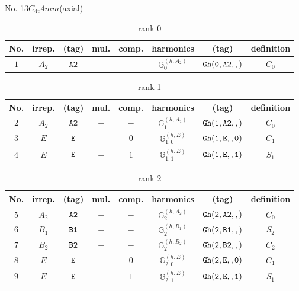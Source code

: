 \documentclass[fleqn,8pt]{jsarticle}
\begin{document}
\setcounter{MaxMatrixCols}{16}

\begin{center}
\LARGE
No. 13\quad$C_{4v}$\quad$4mm$\quad[ tetragonal ] (axial)
\end{center}
\begin{table}[ht!]
\begin{center}
\caption{rank 0}
\renewcommand{\arraystretch}{1.3}
\begin{tabular}{cccccccc} \hline \hline
No. & irrep. & (tag) & mul. & comp. & harmonics & (tag) & definition \\ \hline
$ 1 $ & $ A_{2} $ & $ {\tt A2} $ & $ - $ & $ - $ & $ \mathbb{G}_{0}^{(h,A_{2})} $ & $ {\tt Gh(0,A2,,)} $ & $ C_{0} $ \\
 \hline \hline
\end{tabular}
\end{center}
\end{table}
\begin{table}[ht!]
\begin{center}
\caption{rank 1}
\renewcommand{\arraystretch}{1.3}
\begin{tabular}{cccccccc} \hline \hline
No. & irrep. & (tag) & mul. & comp. & harmonics & (tag) & definition \\ \hline
$ 2 $ & $ A_{2} $ & $ {\tt A2} $ & $ - $ & $ - $ & $ \mathbb{G}_{1}^{(h,A_{2})} $ & $ {\tt Gh(1,A2,,)} $ & $ C_{0} $ \\
$ 3 $ & $ E $ & $ {\tt E} $ & $ - $ & $ 0 $ & $ \mathbb{G}_{1,0}^{(h,E)} $ & $ {\tt Gh(1,E,,0)} $ & $ C_{1} $ \\
$ 4 $ & $ E $ & $ {\tt E} $ & $ - $ & $ 1 $ & $ \mathbb{G}_{1,1}^{(h,E)} $ & $ {\tt Gh(1,E,,1)} $ & $ S_{1} $ \\
 \hline \hline
\end{tabular}
\end{center}
\end{table}
\begin{table}[ht!]
\begin{center}
\caption{rank 2}
\renewcommand{\arraystretch}{1.3}
\begin{tabular}{cccccccc} \hline \hline
No. & irrep. & (tag) & mul. & comp. & harmonics & (tag) & definition \\ \hline
$ 5 $ & $ A_{2} $ & $ {\tt A2} $ & $ - $ & $ - $ & $ \mathbb{G}_{2}^{(h,A_{2})} $ & $ {\tt Gh(2,A2,,)} $ & $ C_{0} $ \\
$ 6 $ & $ B_{1} $ & $ {\tt B1} $ & $ - $ & $ - $ & $ \mathbb{G}_{2}^{(h,B_{1})} $ & $ {\tt Gh(2,B1,,)} $ & $ S_{2} $ \\
$ 7 $ & $ B_{2} $ & $ {\tt B2} $ & $ - $ & $ - $ & $ \mathbb{G}_{2}^{(h,B_{2})} $ & $ {\tt Gh(2,B2,,)} $ & $ C_{2} $ \\
$ 8 $ & $ E $ & $ {\tt E} $ & $ - $ & $ 0 $ & $ \mathbb{G}_{2,0}^{(h,E)} $ & $ {\tt Gh(2,E,,0)} $ & $ C_{1} $ \\
$ 9 $ & $ E $ & $ {\tt E} $ & $ - $ & $ 1 $ & $ \mathbb{G}_{2,1}^{(h,E)} $ & $ {\tt Gh(2,E,,1)} $ & $ S_{1} $ \\
 \hline \hline
\end{tabular}
\end{center}
\end{table}
\end{document}
